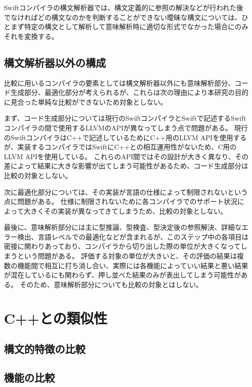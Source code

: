 Swiftコンパイラの構文解析器では、構文定義的に参照の解決などが行われた後でなければどの構文なのかを判断することができない曖昧な構文については、ひとまず特定の構文として解析して意味解析時に適切な形式でなかった場合にのみそれを変換する。

\subsection{構文解析器以外の構成}

比較に用いるコンパイラの要素としては構文解析器以外にも意味解析部分、コード生成部分、最適化部分が考えられるが、これらは次の理由により本研究の目的に見合った単純な比較ができないため対象としない。

まず、コード生成部分については現行のSwiftコンパイラとSwiftで記述するSwiftコンパイラの間で使用するLLVMのAPIが異なってしまう点で問題がある。
現行のSwiftコンパイラはC++で記述しているためにC++用のLLVM APIを使用するが、実装するコンパイラではSwiftにC++との相互運用性がないため、C用のLLVM APIを使用している。
これらのAPI間ではその設計が大きく異なり、その差によって結果に大きな影響が出てしまう可能性があるため、コード生成部分は比較の対象としない。

次に最適化部分については、その実装が言語の仕様によって制限されないという点に問題がある。
仕様に制限されないために各コンパイラでのサポート状況によって大きくその実装が異なってきてしまうため、比較の対象としない。

最後に、意味解析部分には主に型推論、型検査、型決定後の参照解決、詳細なエラー検出、言語レベルでの最適化などが含まれるが、このステップ中の各項目は密接に関わりあっており、コンパイラから切り出した際の単位が大きくなってしまうという問題がある。
評価する対象の単位が大きいと、その評価の結果は複数の機能間で相互に打ち消し合い、実際には各機能によっていい結果と悪い結果が混在しているにも関わらず、押し並べた結果のみが表出してしまう可能性がある。
そのため、意味解析部分についても比較の対象とはしない。

\section{C++との類似性}

\subsection{構文的特徴の比較}

\subsection{機能の比較}


